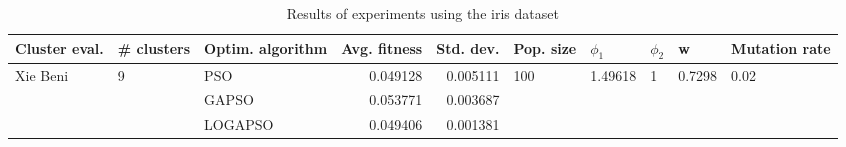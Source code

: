 \begin{table}
\centering
\caption{Results of experiments using the iris dataset}
\begin{tabular}{lllrrlllll}
\toprule
            Cluster eval. &        \# clusters & Optim. algorithm &  Avg. fitness &  Std. dev. &            Pop. size &               $\phi_{1}$ &         $\phi_{2}$ &                       w &         Mutation rate \\
\midrule
\multirow{3}{*}{Xie Beni} & \multirow{3}{*}{9} &              PSO &      0.049128 &   0.005111 & \multirow{3}{*}{100} & \multirow{3}{*}{1.49618} & \multirow{3}{*}{1} & \multirow{3}{*}{0.7298} & \multirow{3}{*}{0.02} \\
                          &                    &            GAPSO &      0.053771 &   0.003687 &                      &                          &                    &                         &                       \\
                          &                    &          LOGAPSO &      0.049406 &   0.001381 &                      &                          &                    &                         &                       \\
\bottomrule
\end{tabular}
\end{table}
